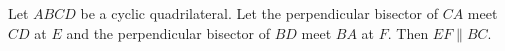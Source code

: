 Let $ABCD$ be a cyclic quadrilateral. Let the perpendicular bisector of $CA$ meet $CD$ at $E$ and the perpendicular bisector of $BD$ meet $BA$ at $F$. Then $EF\parallel BC$.
